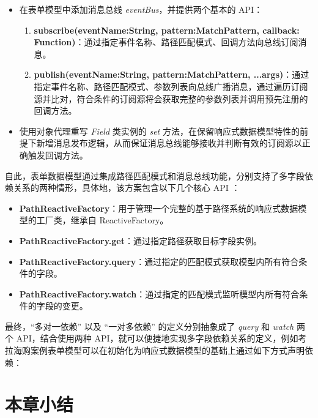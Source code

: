\documentclass[winfonts,master,twoside]{njuthesis}
\begin{document}
\begin{itemize}
    \item 在表单模型中添加消息总线 \textit{eventBus}，并提供两个基本的 API：
          \begin{enumerate}
              \item \textbf{subscribe(eventName:String, pattern:MatchPattern, callback: Function)}：通过指定事件名称、路径匹配模式、回调方法向总线订阅消息。
              \item \textbf{publish(eventName:String, pattern:MatchPattern, ...args)}：通过指定事件名称、路径匹配模式、参数列表向总线广播消息，通过遍历订阅源并比对，符合条件的订阅源将会获取完整的参数列表并调用预先注册的回调方法。
          \end{enumerate}
    \item 使用对象代理重写 \textit{Field} 类实例的 \textit{set} 方法，在保留响应式数据模型特性的前提下新增消息发布逻辑，从而保证消息总线能够接收并判断有效的订阅源以正确触发回调方法。
\end{itemize}

自此，表单数据模型通过集成路径匹配模式和消息总线功能，分别支持了多字段依赖关系的两种情形，具体地，该方案包含以下几个核心 API ：

\begin{itemize}
    \item \textbf{PathReactiveFactory}：用于管理一个完整的基于路径系统的响应式数据模型的工厂类，继承自 ReactiveFactory。
    \item \textbf{PathReactiveFactory.get}：通过指定路径获取目标字段实例。
    \item \textbf{PathReactiveFactory.query}：通过指定的匹配模式获取模型内所有符合条件的字段。
    \item \textbf{PathReactiveFactory.watch}：通过指定的匹配模式监听模型内所有符合条件的字段的变更。
\end{itemize}

最终，“多对一依赖” 以及 “一对多依赖” 的定义分别抽象成了 \textit{query} 和 \textit{watch} 两个 API，结合使用两种 API，就可以便捷地实现多字段依赖关系的定义，例如考拉海购案例表单模型可以在初始化为响应式数据模型的基础上通过如下方式声明依赖：



\section{本章小结}
\end{document}

